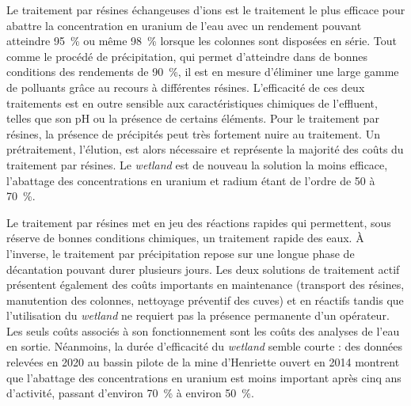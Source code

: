 \documentclass{article}
\begin{document}
Le traitement par résines échangeuses d’ions est le traitement le plus efficace pour abattre la concentration en uranium de l’eau avec un rendement pouvant atteindre 95~\% ou même 98~\% lorsque les colonnes sont disposées en série.  Tout comme le procédé de précipitation, qui permet d’atteindre dans de bonnes conditions des rendements de 90~\%, il est en mesure d’éliminer une large gamme de polluants grâce au recours à différentes résines. L’efficacité de ces deux traitements est en outre sensible aux caractéristiques chimiques de l’effluent, telles que son pH ou la présence de certains éléments. Pour le traitement par résines, la présence de précipités peut très fortement nuire au traitement. Un prétraitement, l’élution, est alors nécessaire et représente la majorité des coûts du traitement par résines. Le \textit{wetland} est de nouveau la solution la moins efficace, l’abattage des concentrations en uranium et radium étant de l’ordre de 50 à 70~\%.

Le traitement par résines met en jeu des réactions rapides qui permettent, sous réserve de bonnes conditions chimiques, un traitement rapide des eaux. \`A l’inverse, le traitement par précipitation repose sur une longue phase de décantation pouvant durer plusieurs jours. Les deux solutions de traitement actif présentent également des coûts importants en maintenance (transport des résines, manutention des colonnes, nettoyage préventif des cuves) et en réactifs tandis que l’utilisation du \textit{wetland} ne requiert pas la présence permanente d’un opérateur. Les seuls coûts associés à son fonctionnement sont les coûts des analyses de l’eau en sortie. Néanmoins, la durée d’efficacité du \textit{wetland} semble courte : des données relevées en 2020 au bassin pilote de la mine d’Henriette ouvert en 2014 montrent que l’abattage des concentrations en uranium est moins important après cinq ans d’activité, passant d'environ 70~\% à environ 50~\%. %

\end{document}
